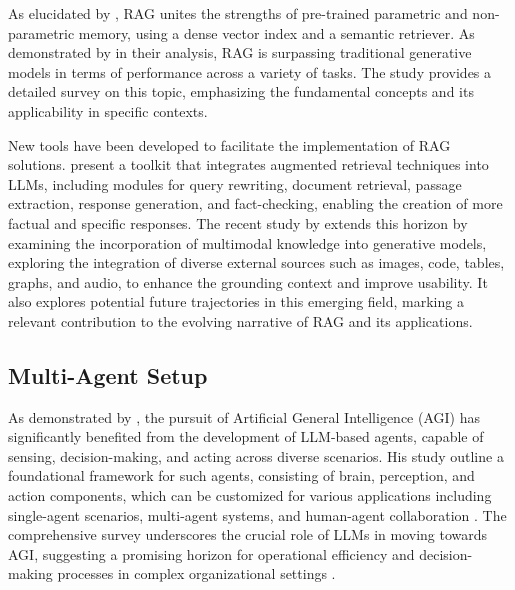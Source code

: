             As elucidated by \citet{Lewis2020}, RAG unites the strengths of pre-trained parametric and non-parametric memory, using a dense vector index and a semantic retriever. 
            As demonstrated by \citet{Li2022} in their analysis, RAG is surpassing traditional generative models in terms of performance across a variety of tasks. The study provides a detailed survey on this topic, emphasizing the fundamental concepts and its applicability in specific contexts.

            New tools have been developed to facilitate the implementation of RAG solutions. \citet{Liu2023} present a toolkit that integrates augmented retrieval techniques into LLMs, including modules for query rewriting, document retrieval, passage extraction, response generation, and fact-checking, enabling the creation of more factual and specific responses. The recent study by \citet{Zhao2023} extends this horizon by examining the incorporation of multimodal knowledge into generative models, exploring the integration of diverse external sources such as images, code, tables, graphs, and audio, to enhance the grounding context and improve usability. It also explores potential future trajectories in this emerging field, marking a relevant contribution to the evolving narrative of RAG and its applications.

            
        \subsection{Multi-Agent Setup} 


            As demonstrated by \citet{xi2023rise}, the pursuit of Artificial General Intelligence (AGI) has significantly benefited from the development of LLM-based agents, capable of sensing, decision-making, and acting across diverse scenarios.  
            His study outline a foundational framework for such agents, consisting of brain, perception, and action components, which can be customized for various applications including single-agent scenarios, multi-agent systems, and human-agent collaboration . 
            The comprehensive survey underscores the crucial role of LLMs in moving towards AGI, suggesting a promising horizon for operational efficiency and decision-making processes in complex organizational settings \citep{xi2023rise}.

